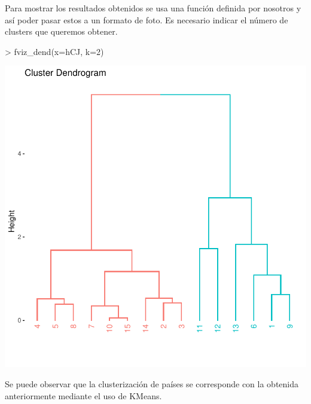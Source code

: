 \documentclass [a4paper] {article}
\begin{document}
\bigskip
Para mostrar los resultados obtenidos se usa una función definida por nosotros y así poder pasar estos
a un formato de foto. Es necesario indicar el número de clusters que queremos obtener.
\begin{center}
\begin{Schunk}
\begin{Sinput}
> fviz_dend(x=hCJ, k=2) 
\end{Sinput}
\end{Schunk}
\includegraphics{G16-p4-figura1}
\end{center}

\bigskip
Se puede observar que la clusterización de países se corresponde con la obtenida anteriormente mediante
el uso de KMeans.
\end{document}
